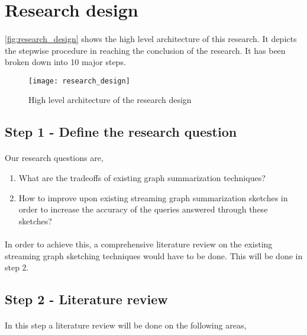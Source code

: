\section{Research design}
\label{section:design_research_design}

\paragraph{}
\autoref{fig:research_design} shows the high level architecture of this research. It depicts the stepwise procedure in reaching the conclusion of the research. It has been broken down into 10 major steps.

\begin{figure}
    \centering \texttt{[image: research\_design]}
    \caption{High level architecture of the research design}
    \label{fig:research_design}
\end{figure}

\subsection*{Step 1 - Define the research question}

\paragraph{}
Our research questions are,

\begin{enumerate}
    \item What are the tradeoffs of existing graph summarization techniques?
    \item How to improve upon existing streaming graph summarization sketches in order to increase the accuracy of the queries answered through these sketches?
\end{enumerate}

\paragraph{}
In order to achieve this, a comprehensive literature review on the existing streaming graph sketching techniques would have to be done. This will be done in step 2.

\subsection*{Step 2 - Literature review}

\paragraph{}
In this step a literature review will be done on the following areas,

